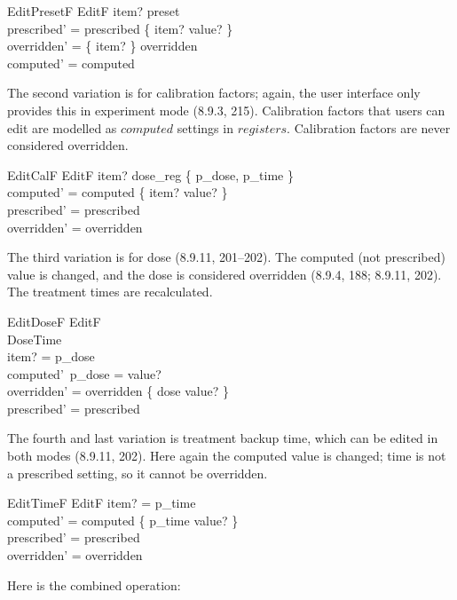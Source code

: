 \documentclass{article}
\begin{document}
\begin{schema}{EditPresetF}
	EditF
\where
	item? \in preset \\
	prescribed' = prescribed \oplus \{ item? \mapsto value? \} \\
	overridden' = \{ item? \} \ndres overridden \\
\also
	computed' = computed \\
\end{schema}
The second variation is for calibration factors; again, the user
interface only provides this in experiment mode
(8.9.3, 215).  Calibration factors that users can edit are
modelled as $computed$ settings in $registers$.  Calibration factors
are never considered overridden.

\begin{schema}{EditCalF}
	EditF
\where
	item? \in dose\_reg \setminus \{ p\_dose, p\_time \} \\
	computed' = computed \oplus \{ item? \mapsto value? \} \\
\also
	prescribed' = prescribed \\
	overridden' = overridden
\end{schema}
The third variation is for dose (8.9.11, 201--202). The computed (not
prescribed) value is changed, and the dose is considered overridden
(8.9.4, 188; 8.9.11, 202).  The treatment times are recalculated.

\begin{schema}{EditDoseF}
	EditF \\
	DoseTime \\
\where
	item? = p\_dose \\
	computed'~p\_dose = value? \\
	overridden' = overridden \oplus \{ dose \mapsto value? \} \\
\also
	prescribed' = prescribed \\
\end{schema}
The fourth and last variation is treatment backup time, which can be
edited in both modes (8.9.11, 202). Here again the computed value is
changed; time is not a prescribed setting, so it cannot be
overridden.

\begin{schema}{EditTimeF}
	EditF
\where
	item? = p\_time \\
	computed' = computed \oplus \{ p\_time \mapsto value? \} \\
\also
	prescribed' = prescribed \\
	overridden' = overridden \\
\end{schema}
Here is the combined operation:
\end{document}
